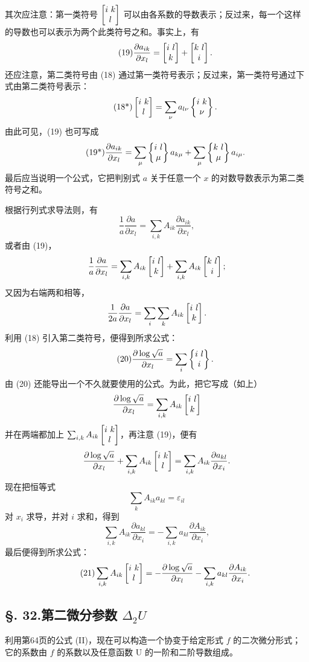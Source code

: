其次应注意：第一类符号 \(\left[\begin{matrix}i\ k\\ l\end{matrix}\right]\) 可以由各系数的导数表示；反过来，每一个这样的导数也可以表示为两个此类符号之和。事实上，有
\begin{equation}\tag{19}
\frac{\partial a_{ik}}{\partial x_l}=\left[\begin{matrix}i\ l\\ k\end{matrix}\right]+\left[\begin{matrix}k\ l\\ i\end{matrix}\right].
\end{equation}
还应注意，第二类符号由 (18) 通过第一类符号表示；反过来，第一类符号通过下式由第二类符号表示：
\begin{equation}\tag{18*}
\left[\begin{matrix}i\ k\\ l\end{matrix}\right]=\sum_\nu a_{l\nu}\left\{\begin{matrix}i\ k\\ \nu\end{matrix}\right\}.
\end{equation}
由此可见，(19) 也可写成
\begin{equation}\tag{19*}
\frac{\partial a_{ik}}{\partial x_l}=\sum_\mu\left\{\begin{matrix}i\ l\\ \mu\end{matrix}\right\}a_{k\mu}+\sum_\mu\left\{\begin{matrix}k\ l\\ \mu\end{matrix}\right\}a_{i\mu}.
\end{equation}
最后应当说明一个公式，它把判别式 \(a\) 关于任意一个 \(x\) 的对数导数表示为第二类符号之和。

根据行列式求导法则，有
\[
\frac{1}{a}\frac{\partial a}{\partial x_l}=\sum_{i,k}A_{ik}\frac{\partial a_{ik}}{\partial x_l},
\]
或者由 (19)，
\[
\frac{1}{a}\frac{\partial a}{\partial x_l}=\sum_{i,k}A_{ik}\left[\begin{matrix}i\ l\\ k\end{matrix}\right]+\sum_{i,k}A_{ik}\left[\begin{matrix}k\ l\\ i\end{matrix}\right];
\]
又因为右端两和相等，
\[
\frac{1}{2a}\frac{\partial a}{\partial x_l}=\sum_i\sum_kA_{ik}\left[\begin{matrix}i\ l\\ k\end{matrix}\right].
\]
利用 (18) 引入第二类符号，便得到所求公式：
\begin{equation}\tag{20}
\frac{\partial\log\sqrt{a}}{\partial x_l}=\sum_i\left\{\begin{matrix}i\ l\\ i\end{matrix}\right\}.
\end{equation}
由 (20) 还能导出一个不久就要使用的公式。为此，把它写成（如上）
\[
\frac{\partial\log\sqrt{a}}{\partial x_l}=\sum_{i,k}A_{ik}\left[\begin{matrix}i\ l\\ k\end{matrix}\right]
\]
并在两端都加上 \(\sum_{i,k}A_{ik}\left[\begin{matrix}i\ k\\ l\end{matrix}\right]\)，再注意 (19)，便有
\[
\frac{\partial\log\sqrt{a}}{\partial x_l}+\sum_{i,k}A_{ik}\left[\begin{matrix}i\ k\\ l\end{matrix}\right]=\sum_{i,k}A_{ik}\frac{\partial a_{kl}}{\partial x_i}.
\]
现在把恒等式
\[
\sum_k A_{ik}a_{kl}=\varepsilon_{il}
\]
对 \(x_i\) 求导，并对 \(i\) 求和，得到
\[
\sum_{i,k}A_{ik}\frac{\partial a_{kl}}{\partial x_i}=-\sum_{i,k}a_{kl}\frac{\partial A_{ik}}{\partial x_i},
\]
最后便得到所求公式：
\begin{equation}\tag{21}
\sum_{i,k}A_{ik}\left[\begin{matrix}i\ k\\ l\end{matrix}\right]=-\frac{\partial\log\sqrt{a}}{\partial x_l}-\sum_{i,k}a_{kl}\frac{\partial A_{ik}}{\partial x_i}.
\end{equation}

\subsection*{\S. 32.\quad 第二微分参数 \(\Delta_2 U\)}
利用第64页的公式 (II)，现在可以构造一个协变于给定形式 \(f\) 的二次微分形式；它的系数由 \(f\) 的系数以及任意函数 U 的一阶和二阶导数组成。

